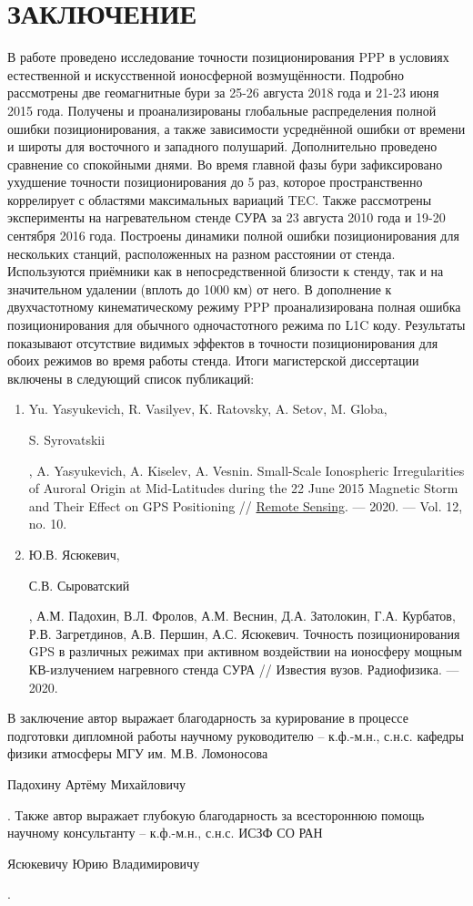 \chapter*{ЗАКЛЮЧЕНИЕ}

В работе проведено исследование точности позиционирования PPP в условиях естественной и искусственной ионосферной возмущённости. 
Подробно рассмотрены две геомагнитные бури за 25-26 августа 2018 года и 21-23 июня 2015 года. 
Получены и проанализированы глобальные распределения полной ошибки позиционирования, а также зависимости усреднённой ошибки от времени и широты для восточного и западного полушарий. 
Дополнительно проведено сравнение со спокойными днями. 
Во время главной фазы бури зафиксировано ухудшение точности позиционирования до 5 раз, которое пространственно коррелирует с областями максимальных вариаций TEC.  
Также рассмотрены эксперименты на нагревательном стенде СУРА за 23 августа 2010 года и 19-20 сентября 2016 года.
Построены динамики полной ошибки позиционирования для нескольких станций, расположенных на разном расстоянии от стенда.
Используются приёмники как в непосредственной близости к стенду, так и на значительном удалении (вплоть до 1000 км) от него.
В дополнение к двухчастотному кинематическому режиму PPP проанализирована полная ошибка позиционирования для обычного одночастотного режима по L1C коду.
Результаты показывают отсутствие видимых эффектов в точности позиционирования для обоих режимов во время работы стенда.
Итоги магистерской диссертации включены в следующий список публикаций:
\begin{enumerate}[leftmargin=*]
\item Yu. Yasyukevich, R. Vasilyev, K. Ratovsky, A. Setov, M. Globa, \begin{bf}S. Syrovatskii\end{bf}, A. Yasyukevich, A. Kiselev, A. Vesnin. Small-Scale Ionospheric Irregularities of Auroral Origin at Mid-Latitudes during the 22 June 2015 Magnetic Storm and Their Effect on GPS Positioning // \href{http://dx.doi.org/10.3390/rs12101579}{Remote Sensing}. --- 2020. --- Vol. 12, no. 10. 
\item Ю.В. Ясюкевич, \begin{bf}С.В. Сыроватский\end{bf}, А.М. Падохин, В.Л. Фролов, А.М. Веснин, Д.А. Затолокин, Г.А. Курбатов, Р.В. Загретдинов, А.В. Першин, А.С. Ясюкевич. Точность позиционирования GPS в различных режимах при активном воздействии на ионосферу мощным КВ-излучением нагревного стенда СУРА // Известия вузов. Радиофизика. --- 2020. 
\end{enumerate}

В заключение автор выражает благодарность за курирование в процессе подготовки дипломной работы научному руководителю -- к.ф.-м.н., с.н.с. кафедры физики атмосферы МГУ им. М.В. Ломоносова \begin{bf}Падохину Артёму Михайловичу\end{bf}. 
Также автор выражает глубокую благодарность за всестороннюю помощь научному консультанту -- к.ф.-м.н., с.н.с. ИСЗФ СО РАН \begin{bf}Ясюкевичу Юрию Владимировичу\end{bf}.  